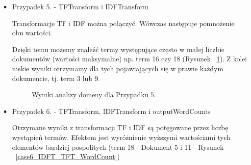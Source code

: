 \documentclass{classrep}
\begin{document}
\begin{itemize}
 \item  Przypadek 5. - TFTransform i IDFTransform

    Transformacje TF i IDF można połączyć. Wówczas następuje pomnożenie obu wartości. 
    
    Dzięki temu możemy znaleźć termy występujące często w małej liczbie dokumentów (wartości maksymalne) np. term 16 czy 18 (Rysunek ~\ref{FTIMS_case5_IDFT_TFT}). Z kolei niskie wyniki otrzymamy dla tych pojawiających się w prawie każdym dokumencie, tj. term 3 lub 9.
    \begin{table}[H]
    \centering
    \caption{Parametry zastosowanego filtra StringToWordVector dla przypadku 5.}
    \label{tab:apriori_num_params}
    \end{table}
   
   
    \begin{figure}[H] 
    	\begin{center}
        \caption{Wyniki analizy domeny dla Przypadku 5.}
        \label{FTIMS_case5_IDFT_TFT}
    	\end{center}
    \end{figure}


 \item  Przypadek 6. - TFTransform, IDFTransform i outputWordCounts
    
    Otrzymane wyniki z transformacji TF i IDF są potęgowane przez liczbę wystąpień termów. Efektem jest wyróżnienie wyższymi wartościami tych elementów bardziej pospolitych (term 18 - Dokument 5 i 11 - Rysunek ~\ref{case6_IDFT_TFT_WordCount})
    \begin{table}[H]
    \centering
    \caption{Parametry zastosowanego filtra StringToWordVector dla przypadku 6.}
    \label{tab:apriori_num_params}
    \end{table}
   

\end{itemize}
\end{document}
